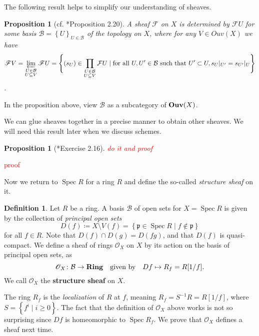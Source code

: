 \documentclass[11pt,leqno]{article}
\newcommand{\sai}[1]{\textcolor{red}{#1}}
\theoremstyle{plain}
\newtheorem{proposition}[lem]{Proposition}
\theoremstyle{definition}
\newtheorem{definition/}[lem]{Definition}
\newenvironment{definition}
  {\renewcommand{\qedsymbol}{\textdagger}%
   \pushQED{\qed}\begin{definition/}}
  {\popQED\end{definition/}}
\numberwithin{equation}{section}
\numberwithin{lem}{section}
\newcommand{\cbr}[1]{\left\{#1\right\}}
\newcommand{\bidx}[1]{\textbf{#1\index{#1}}} %
\DeclareMathOperator{\Spec}{Spec}
\newcommand{\catname}[1]{{\normalfont\mathbf{#1}}}
\newcommand{\Ring}{\catname{Ring}}
\newcommand{\Ouv}{\catname{Ouv}}
\begin{document}
The following result helps to simplify our understanding of sheaves.
\begin{proposition}[cf. \cite{gw}*{Proposition 2.20}]
    A sheaf $\mathscr F$ on $X$ is determined by $\mathscr FU$ for some basis $\mathcal B = \cbr{U}_{U\in\mathcal B}$ of the topology on $X$, where for any $V\in Ouv(X)$ we have 
    \begin{equation}
        \mathscr FV = \varprojlim_{\substack{U\in \mathcal B\\U\subseteq V}}\mathscr FU = \Bigg\{(s_U)\in \prod_{\substack{U\in \mathcal B\\U\subseteq V}}\mathcal FU\mid \text{for all }U,U^\prime\in\mathcal B \text{ such that } U^\prime\subset U, s_U|_{U^\prime} = s_{U^\prime}|_U\Bigg\}
    \end{equation}.
\end{proposition}
In the proposition above, view $\mathcal B$ as a subcategory of $\Ouv(X)$.

We can glue sheaves together in a precise manner to obtain other sheaves. We will need this result later when we discuss schemes.
\begin{proposition}[\cite{gw}*{Exercise 2.16}]
    \sai{do it and proof}
\end{proposition}
\sai{proof}

Now we return to $\Spec R$ for a ring $R$ and define the so-called \textit{structure sheaf} on it.
\begin{definition}
    Let $R$ be a ring. A basis $\mathcal B$ of open sets for $X=\Spec R$ is given by the collection of \textit{principal open sets} 
    \begin{equation}
        D(f) \coloneqq X\setminus V(f) = \cbr{\mathfrak p\in\Spec R\mid f\not\in \mathfrak p}
    \end{equation}
    for all $f\in R$. Note that $D(f)\cap D(g) = D(fg)$, and that $D(f)$ is quasi-compact.
    We define a sheaf of rings \bidx{$\mathscr O_X$} on $X$ by its action on the basis of principal open sets, as
    \begin{equation}
        \mathscr O_X\colon \mathcal B\to \Ring \quad\text{given by}\quad Df\mapsto R_f = R[1/f].
    \end{equation}
    We call $\mathscr O_X$ the \bidx{structure sheaf} on $X$.
\end{definition}
The ring $R_f$ is the \textit{localization} of $R$ at $f$, meaning $R_f = S^{-1}R = R[1/f]$, where $S = \cbr{f^i\mid i\geq 0}$. The fact that the definition of $\mathscr O_X$ above works is not so surprising since $Df$ is homeomorphic to $\Spec R_f$. We prove that $\mathscr O_X$ defines a sheaf next time.
\end{document}

